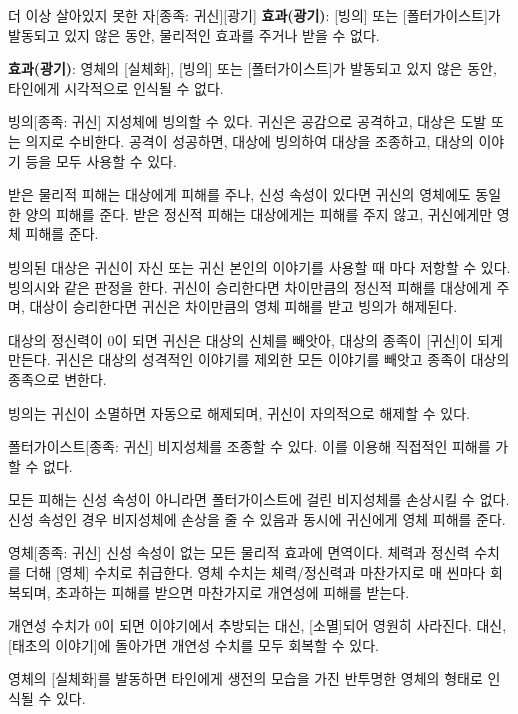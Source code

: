 \documentclass{report}
\begin{document}
	\begin{story}{더 이상 살아있지 못한 자}{[종족: 귀신][광기]}
		\textbf{효과(광기)}: [빙의] 또는 [폴터가이스트]가 발동되고 있지 않은 동안, 물리적인 효과를 주거나 받을 수 없다.
		
		\textbf{효과(광기)}: 영체의 [실체화], [빙의] 또는 [폴터가이스트]가 발동되고 있지 않은 동안, 타인에게 시각적으로 인식될 수 없다.
		
		\smallskip
		
	\end{story}
	
	\begin{story}{빙의}{[종족: 귀신]}
		지성체에 빙의할 수 있다. 귀신은 공감으로 공격하고, 대상은 도발 또는 의지로 수비한다. 공격이 성공하면, 대상에 빙의하여 대상을 조종하고, 대상의 이야기 등을 모두 사용할 수 있다.
		
		받은 물리적 피해는 대상에게 피해를 주나, 신성 속성이 있다면 귀신의 영체에도 동일한 양의 피해를 준다. 받은 정신적 피해는 대상에게는 피해를 주지 않고, 귀신에게만 영체 피해를 준다.
		
		빙의된 대상은 귀신이 자신 또는 귀신 본인의 이야기를 사용할 때 마다 저항할 수 있다. 빙의시와 같은 판정을 한다. 귀신이 승리한다면 차이만큼의 정신적 피해를 대상에게 주며, 대상이 승리한다면 귀신은 차이만큼의 영체 피해를 받고 빙의가 해제된다.
		
		대상의 정신력이 0이 되면 귀신은 대상의 신체를 빼앗아, 대상의 종족이 [귀신]이 되게 만든다. 귀신은 대상의 성격적인 이야기를 제외한 모든 이야기를 빼앗고 종족이 대상의 종족으로 변한다.
		
		빙의는 귀신이 소멸하면 자동으로 해제되며, 귀신이 자의적으로 해제할 수 있다.
		
		\smallskip
		
	\end{story}
	
	\begin{story}{폴터가이스트}{[종족: 귀신]}
		비지성체를 조종할 수 있다. 이를 이용해 직접적인 피해를 가할 수 없다.
		
		모든 피해는 신성 속성이 아니라면 폴터가이스트에 걸린 비지성체를 손상시킬 수 없다. 신성 속성인 경우 비지성체에 손상을 줄 수 있음과 동시에 귀신에게 영체 피해를 준다.
		
		\smallskip
		
	\end{story}
	
	\begin{story}{영체}{[종족: 귀신]}
		신성 속성이 없는 모든 물리적 효과에 면역이다. 체력과 정신력 수치를 더해 [영체] 수치로 취급한다. 영체 수치는 체력/정신력과 마찬가지로 매 씬마다 회복되며, 초과하는 피해를 받으면 마찬가지로 개연성에 피해를 받는다.
		
		개연성 수치가 0이 되면 이야기에서 추방되는 대신, [소멸]되어 영원히 사라진다. 대신, [태초의 이야기]에 돌아가면 개연성 수치를 모두 회복할 수 있다.
		
		영체의 [실체화]를 발동하면 타인에게 생전의 모습을 가진 반투명한 영체의 형태로 인식될 수 있다.
		
		\smallskip
		
	\end{story}
\end{document}
